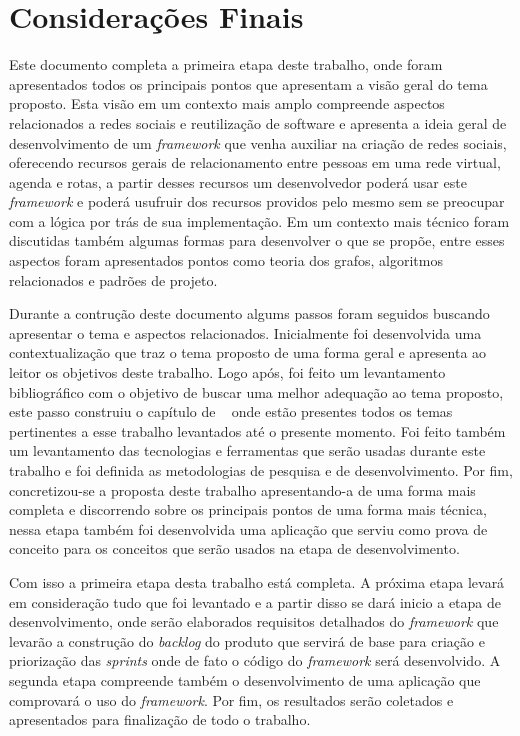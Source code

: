 \chapter{Considerações Finais}
\label{chapter:Consideracoes_Finais}

 Este documento completa a primeira etapa deste trabalho, onde foram apresentados todos os principais pontos que apresentam a visão geral do tema proposto. Esta visão em um contexto mais amplo compreende aspectos relacionados a redes sociais e reutilização de software e apresenta a ideia geral de desenvolvimento de um \textit{framework} que venha auxiliar na criação de redes sociais, oferecendo recursos gerais de relacionamento entre pessoas em uma rede virtual, agenda e rotas, a partir desses recursos um desenvolvedor poderá usar este \textit{framework} e poderá usufruir dos recursos providos pelo mesmo sem se preocupar com a lógica por trás de sua implementação. Em um contexto mais técnico foram discutidas também algumas formas para desenvolver o que se propõe, entre esses aspectos foram apresentados pontos como teoria dos grafos, algoritmos relacionados e padrões de projeto.

Durante a contrução deste documento algums passos foram seguidos buscando apresentar o tema e aspectos relacionados. Inicialmente foi desenvolvida uma contextualização que traz o tema proposto de uma forma geral e apresenta ao leitor os objetivos deste trabalho. Logo após, foi feito um levantamento bibliográfico com o objetivo de buscar uma melhor adequação ao tema proposto, este passo construiu o capítulo de ~ onde estão presentes todos os temas pertinentes a esse trabalho levantados até o presente momento. Foi feito também um levantamento das tecnologias e ferramentas que serão usadas durante este trabalho e foi definida as metodologias de pesquisa e de desenvolvimento. Por fim, concretizou-se a proposta deste trabalho apresentando-a de uma forma mais completa e discorrendo sobre os principais pontos de uma forma mais técnica, nessa etapa também foi desenvolvida uma aplicação que serviu como prova de conceito para os conceitos que serão usados na etapa de desenvolvimento.

Com isso a primeira etapa desta trabalho está completa. A próxima etapa levará em consideração tudo que foi levantado e a partir disso se dará inicio a etapa de desenvolvimento, onde serão elaborados requisitos detalhados do \textit{framework} que levarão a construção do \textit{backlog} do produto que servirá de base para criação e priorização das \textit{sprints} onde de fato o código do \textit{framework} será desenvolvido. A segunda etapa compreende também o desenvolvimento de uma aplicação que comprovará o uso do \textit{framework}. Por fim, os resultados serão coletados e apresentados para finalização de todo o trabalho.
